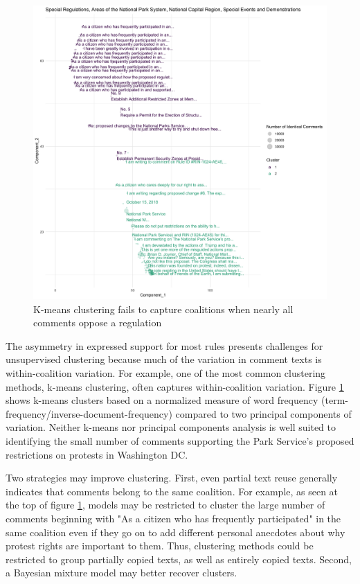 \begin{figure}[h!]
    \caption{K-means clustering fails to capture coalitions when nearly all comments oppose a regulation}
    \label{fig:kmeans}
    \centering
    \includegraphics[width = 7in]{Figs/kmeans.png}
\end{figure}

The asymmetry in expressed support for most rules presents challenges for unsupervised clustering because much of the variation in comment texts is within-coalition variation. For example, one of the most common clustering methods, k-means clustering, often captures within-coalition variation. Figure \ref{fig:kmeans} shows k-means clusters based on a normalized measure of word frequency (term-frequency/inverse-document-frequency) compared to two principal components of variation. Neither k-means nor principal components analysis is well suited to identifying the small number of comments supporting the Park Service's proposed restrictions on protests in Washington DC.



Two strategies may improve clustering. First, even partial text reuse generally indicates that comments belong to the same coalition. For example, as seen at the top of figure \ref{fig:kmeans}, models may be restricted to cluster the large number of comments beginning with "As a citizen who has frequently participated" in the same coalition even if they go on to add different personal anecdotes about why protest rights are important to them. Thus, clustering methods could be restricted to group partially copied texts, as well as entirely copied texts. Second, a Bayesian mixture model may better recover clusters.


